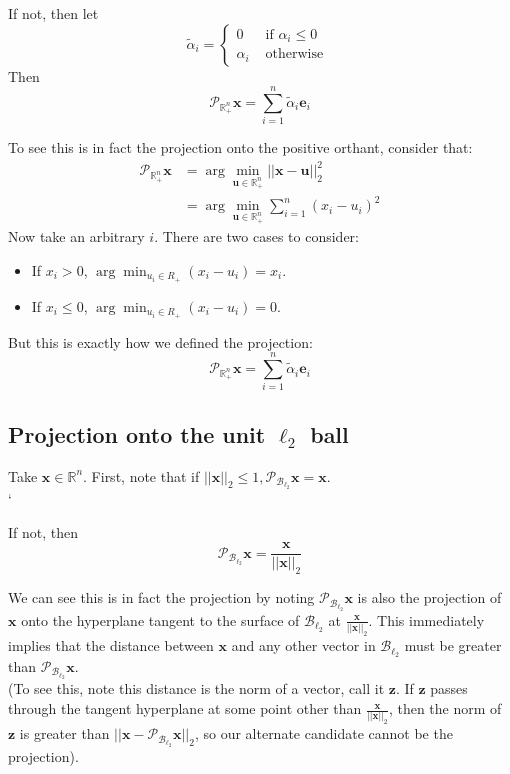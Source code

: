 \documentclass[paper=a4, fontsize=11pt]{scrartcl} %
\numberwithin{equation}{section} %
\numberwithin{figure}{section} %
\numberwithin{table}{section} %
\begin{document}
If not, then let
\[
\tilde{\alpha}_i =
\begin{cases}
0 & \text{ if } \alpha_i \leq 0 \\
\alpha_i & \text{ otherwise }
\end{cases}
\]
Then
\[\mathcal{P}_{\mathbb{R}_+^n} \bm{x} = \sum_{i=1}^n \tilde{\alpha}_i \bm{e}_i\]

To see this is in fact the projection onto the positive orthant, consider that:
\begin{align*}
\mathcal{P}_{\mathbb{R}_+^n} \bm{x} &= \arg \min_{\bm{u} \in \mathbb{R}_+^n} ||\bm{x} - \bm{u}||_2^2 \\
   &= \arg \min_{\bm{u} \in \mathbb{R}_+^n} \sum_{i=1}^n (x_i - u_i)^2
\end{align*}
Now take an arbitrary $i$. There are two cases to consider:
\begin{itemize}
\item If $x_i > 0$, $\arg \min_{u_i \in R_+} (x_i - u_i) = x_i$.
\item If $x_i \leq 0$, $\arg \min_{u_i \in R_+} (x_i - u_i) = 0$.
\end{itemize}

But this is exactly how we defined the projection:
\[\mathcal{P}_{\mathbb{R}_+^n} \bm{x} = \sum_{i=1}^n \tilde{\alpha}_i \bm{e}_i\]

\subsection{Projection onto the unit $\ell_2$ ball}

Take $\bm{x} \in \mathbb{R}^n$. First, note that if $||\bm{x}||_2 \leq 1, \mathcal{P}_{\mathcal{B}_{\ell_2}} \bm{x} = \bm{x}$. \\`

If not, then 
\[\mathcal{P}_{\mathcal{B}_{\ell_2}} \bm{x} = \frac{\bm{x}}{||\bm{x}||_2} \]

We can see this is in fact the projection by noting $\mathcal{P}_{\mathcal{B}_{\ell_2}} \bm{x}$ is also the projection of $\bm{x}$ onto the hyperplane tangent to the surface of $\mathcal{B}_{\ell_2}$ at $\frac{\bm{x}}{||\bm{x}||_2}$. This immediately implies that the distance between $\bm{x}$ and any other vector in $\mathcal{B}_{\ell_2}$ must be greater than $\mathcal{P}_{\mathcal{B}_{\ell_2}} \bm{x}$.\\

(To see this, note this distance is the norm of a vector, call it $\bm{z}$. If $\bm{z}$ passes through the tangent hyperplane at some point other than $\frac{\bm{x}}{||\bm{x}||_2}$, then the norm of $\bm{z}$ is greater than $||\bm{x} - \mathcal{P}_{\mathcal{B}_{\ell_2}} \bm{x}||_2$, so our alternate candidate  cannot be the projection).
\end{document}
